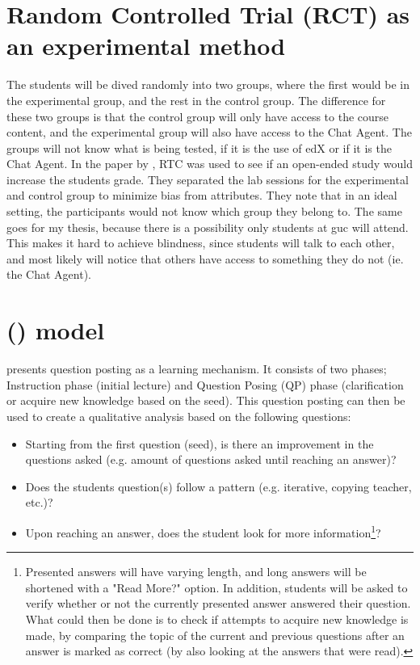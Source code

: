 \section{Random Controlled Trial (RCT) as an experimental method}
\label{chapter4:rtc}
The students will be dived randomly into two groups, where the first would be in the experimental group, and the rest in the control group. The difference for these two 
groups is that the control group will only have access to the course content, and the experimental group will also have access to the Chat Agent. The groups will not know 
what is being tested, if it is the use of edX or if it is the Chat Agent. 
\vspace{0.5em}\newline
In the paper by \citet{Bezakova2014}, RTC was used to see if an open-ended study would increase the students grade. They separated the lab sessions for the experimental 
and control group to minimize bias from attributes. They note that in an ideal setting, the participants would not know which group they belong to. The same goes for 
my thesis, because there is a possibility only students at \gls{guc} will attend. This makes it hard to achieve blindness, since students will talk to each other, 
and most likely will notice that others have access to something they do not (ie. the Chat Agent).

\section{ () model}
\label{chapter4:qa_model}
\citet{Mishra2015} presents question posting as a learning mechanism. It consists of two phases; Instruction phase (initial lecture) and Question Posing (QP) phase 
(clarification or acquire new knowledge based on the seed). This question posting can then be used to create a qualitative analysis based on the following questions:
\begin{itemize}
	\item Starting from the first question (seed), is there an improvement in the questions asked 
	(e.g. amount of questions asked until reaching an answer)?
	\item Does the students question(s) follow a pattern (e.g. iterative, copying teacher, etc.)?
	\item Upon reaching an answer, does the student look for more information\footnote{
		Presented answers will have varying length, and long answers will be shortened with a "Read More?" option.
		In addition, students will be asked to verify whether or not the currently presented answer answered their question.
		What could then be done is to check if attempts to acquire new knowledge is made, by comparing the topic of the current 
		and previous questions after an answer is marked as correct (by also looking at the answers that were read).
		}?
\end{itemize}

